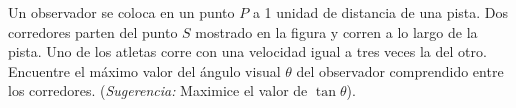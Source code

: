 \item Un observador se coloca en un punto $P$ a 1 unidad de distancia de una pista. Dos corredores parten del punto $S$ mostrado en la figura y corren a lo largo de la pista. Uno de los atletas corre con una velocidad igual a tres veces la del otro. Encuentre el máximo valor del ángulo visual $\theta$ del observador comprendido entre los corredores. (\textit{Sugerencia:} Maximice el valor de $\tan \theta$).
\begin{center}
\end{center}
